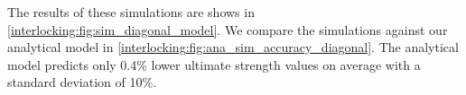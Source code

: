 The results of these simulations are shows in \cref{interlocking:fig:sim_diagonal_model}.
We compare the simulations against our analytical model in \cref{interlocking:fig:ana_sim_accuracy_diagonal}.
The analytical model predicts only 0.4\% lower ultimate strength values on average with a standard deviation of 10\%.









